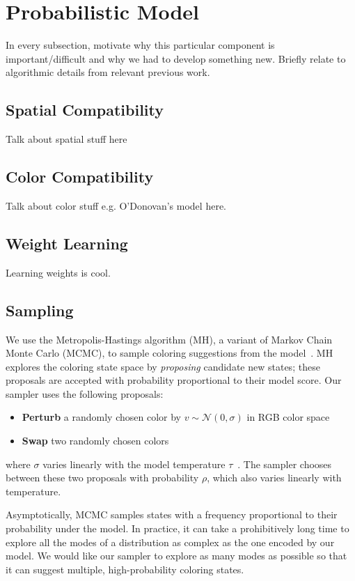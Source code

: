 \section{Probabilistic Model}
\label{sec:model}

In every subsection, motivate why this particular component is important/difficult and why we had to develop something new. Briefly relate to algorithmic details from relevant previous work.

\subsection{Spatial Compatibility}
\label{sec:spatialCompat}
Talk about spatial stuff here

\subsection{Color Compatibility}
\label{sec:colorCompat}
Talk about color stuff e.g. O'Donovan's model here.

\subsection{Weight Learning}
\label{sec:weights}
Learning weights is cool.

\subsection{Sampling}
\label{sec:sampling}

We use the Metropolis-Hastings algorithm (MH), a variant of Markov Chain Monte Carlo (MCMC), to sample coloring suggestions from the model~\cite{Metropolis,Hastings}. MH explores the coloring state space by \emph{proposing} candidate new states; these proposals are accepted with probability proportional to their model score. Our sampler uses the following proposals:
\begin{itemize}
	\item{\textbf{Perturb} a randomly chosen color by $v \sim \mathcal{N}(0, \sigma)$ in RGB color space}
	\item{\textbf{Swap} two randomly chosen colors}
\end{itemize}
where $\sigma$ varies linearly with the model temperature $\tau$~. The sampler chooses between these two proposals with probability $\rho$, which also varies linearly with temperature.

Asymptotically, MCMC samples states with a frequency proportional to their probability under the model. In practice, it can take a prohibitively long time to explore all the modes of a distribution as complex as the one encoded by our model. We would like our sampler to explore as many modes as possible so that it can suggest multiple, high-probability coloring states.

